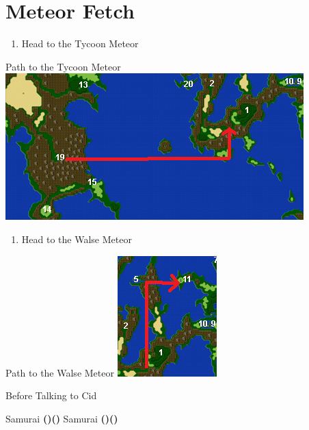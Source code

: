 \chapter{Meteor Fetch}

\vspace{\baselineskip}

\begin{paracol}{2}

\begin{enumerate}
    \item Head to the Tycoon Meteor
\end{enumerate}

\switchcolumn
\begin{misc}{Path to the Tycoon Meteor}
    \includegraphics[scale=0.75]{../Graphics/Maps/7. To Tycoon Meteor.png}
\end{misc}

\switchcolumn*
\begin{enumerate}[resume]
    \item Head to the Walse Meteor
\end{enumerate}

\switchcolumn
\begin{misc}{Path to the Walse Meteor}
    \includegraphics{../Graphics/Maps/8. To Walse Meteor.png}
\end{misc}

\switchcolumn*
\begin{menu}{Before Talking to Cid}
    \varwb
    \begin{jobMenu}
        \faris Samurai \textbf{(\pointLeft)(\pointDown)}
        \bartz Samurai \textbf{(\pointLeft)(\pointDown)} \ability{!\hide}
    \end{jobMenu}
    \varwe
\end{menu}


\end{paracol}
